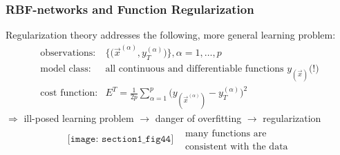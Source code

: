 
\subsubsection{RBF-networks and Function Regularization}
Regularization theory addresses the following, more general learning problem:
\[ \begin{array}{ll}
	\text{observations:} & \Big\{ \Big( \vec{x}^{(\alpha)}, y_T^{(\alpha)}
		\Big) \Big\}, \alpha = 1, \ldots, p \\
	\text{model class:} & \text{all continuous and differentiable 
		functions } y_{(\vec{x})} \text{(!)}\\
	\text{cost function:} & E^T = \frac{1}{2p} \sum\limits_{\alpha = 1}^p
		\Big( y_{(\vec{x}^{(\alpha)})} - y_T^{(\alpha)} \Big)^2
\end{array} \]
$\Rightarrow$ ill-posed learning problem $\rightarrow$ danger of overfitting
$\rightarrow$ regularization
\[ \begin{array}{ll}
  \texttt{[image: section1\_fig44]}
  & \substack{\text{many functions are} \\ 
    \text{consistent with the data}}
\end{array} \]
\\
